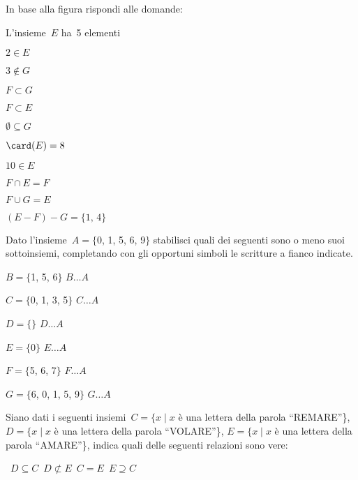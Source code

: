 \begin{esercizio}
In base alla figura rispondi alle domande:
\begin{multicols}{2}
\TabPositions{4.5cm}
\begin{enumeratea}
\item L'insieme~$E$ ha~5 elementi \tab\boxV\quad\boxF
\item $2\in E$ \tab\boxV\quad\boxF
\item $3\notin G$ \tab\boxV\quad\boxF
\item $F\subset G$ \tab\boxV\quad\boxF
\item $F\subset E$ \tab\boxV\quad\boxF
\item $\emptyset \subseteq G$ \tab\boxV\quad\boxF
\item $\card(E)=8$ \tab\boxV\quad\boxF
\item $10\in E$ \tab\boxV\quad\boxF
\item $F\cap E=F$ \tab\boxV\quad\boxF
\item $F\cup G=E$ \tab\boxV\quad\boxF
\item $(E-F)-G=\{\text{1, 4}\}$ \tab\boxV\quad\boxF
\end{enumeratea}
\begin{center}
 
\end{center}
\end{multicols}
\end{esercizio}
\pagebreak
\begin{esercizio}
Dato l'insieme~$A=\{$0, 1, 5, 6, 9$\}$ stabilisci
quali dei seguenti sono o meno suoi sottoinsiemi, completando con gli
opportuni simboli le scritture a fianco indicate.
\begin{multicols}{2}
\TabPositions{3cm}
\begin{enumeratea}
\item $B=\{$1, 5, 6$\}$ \tab $B\ldots A$
\item $C=\{$0, 1, 3, 5$\}$ \tab $C \ldots A$
\item $D=\{ \}$ \tab $D \ldots A$
\item $E=\{0\}$ \tab $E \ldots A$
\item $F=\{$5, 6, 7$\}$ \tab $F \ldots A$
\item $G=\{$6, 0, 1, 5, 9$\}$ \tab $G\ldots A$
\end{enumeratea}
\end{multicols}
\end{esercizio}

\begin{esercizio}
Siano dati i seguenti insiemi~$C=\{x\mid x$ è una lettera della parola ``REMARE''\}, $D=\{x\mid x$ è una lettera della parola ``VOLARE''\},
$E=\{x\mid x$ è una lettera della parola ``AMARE''\},
indica quali delle seguenti relazioni sono vere:
\begin{center}
\boxA\quad~$D\subseteq C$\quad\boxB\quad~$D\not\subset E$\quad\boxC\quad~$C=E$\quad\boxD\quad~$E\supseteq C$
\end{center}
\end{esercizio}


